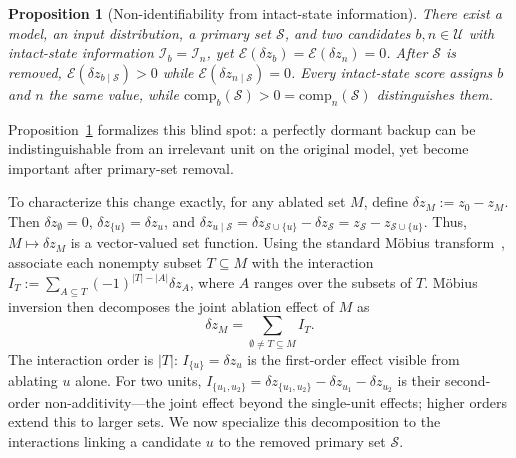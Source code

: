 \documentclass{article} %
\theoremstyle{plain}
\newtheorem{proposition}{Proposition}
\theoremstyle{definition}
\newtheorem{definition}{Definition}
\newcommand{\comp}{\mathrm{comp}}
\newcommand{\energy}{\mathcal{E}}
\newcommand{\dz}{\delta z}
\newcommand{\Sset}{\mathcal{S}}
\newcommand{\Uset}{\mathcal{U}}
\begin{document}

\begin{proposition}[Non-identifiability from intact-state information]
\label{prop:blind}
There exist a model, an input distribution, a primary set $\Sset$, and two candidates
$b,n\in\Uset$ with intact-state information
$\mathcal{I}_b=\mathcal{I}_n$, yet
$\energy(\dz_b)=\energy(\dz_n)=0$.
After $\Sset$ is removed,
$\energy(\dz_{b\mid\Sset})>0$ while
$\energy(\dz_{n\mid\Sset})=0$.
Every intact-state score assigns $b$ and $n$ the same value, while
$\comp_b(\Sset)>0=\comp_n(\Sset)$ distinguishes them.
\end{proposition}

Proposition~\ref{prop:blind} formalizes this blind spot: a perfectly dormant backup can be indistinguishable from an irrelevant unit on the original model, yet become important after primary-set removal.

To characterize this change exactly, for any ablated set $M$, define $\dz_M:=z_0-z_M$.
Then $\dz_\emptyset=0$, $\dz_{\{u\}}=\dz_u$, and
$\dz_{u\mid\Sset}
=\dz_{\Sset\cup\{u\}}-\dz_\Sset
=z_\Sset-z_{\Sset\cup\{u\}}$.
Thus, $M\mapsto\dz_M$ is a vector-valued set function.
Using the standard M\"obius transform~\citep{rota1964foundations}, associate each nonempty subset $T\subseteq M$ with the interaction
$I_T:=\sum_{A\subseteq T}(-1)^{|T|-|A|}\dz_A$,
where $A$ ranges over the subsets of $T$.
M\"obius inversion then decomposes the joint ablation effect of $M$ as
\begin{equation}
\dz_M
=
\sum_{\emptyset\neq T\subseteq M} I_T .
\label{eq:mobius}
\end{equation}
The interaction order is $|T|$: $I_{\{u\}}=\dz_u$ is the first-order effect visible from ablating $u$ alone.
For two units,
$I_{\{u_1,u_2\}}=\dz_{\{u_1,u_2\}}-\dz_{u_1}-\dz_{u_2}$
is their second-order non-additivity---the joint effect beyond the single-unit effects; higher orders extend this to larger sets.
We now specialize this decomposition to the interactions linking a candidate $u$ to the removed primary set $\Sset$.
\end{document}
